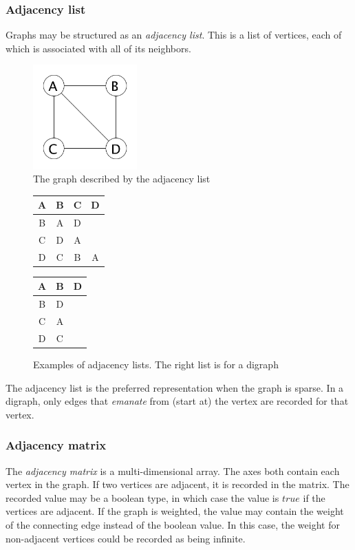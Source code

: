\documentclass{article}
\begin{document}
\subsubsection{Adjacency list}
Graphs may be structured as an {\em adjacency list}. This is a list of vertices, each of which is associated with
all of its neighbors.

\begin{figure}[H]
  \centering
  \includegraphics[width=4cm]{adjacency_list_graph}
  \caption{The graph described by the adjacency list}
\end{figure}

\begin{figure}[H]
  \centering
  \begin{tabular}{|c|c c c|}
    \hline
    A  & B & C & D  \\ [0.5ex]
    \hline
    B  & A & D & \  \\
    \hline
    C  & D & A & \  \\
    \hline
    D  & C & B & A  \\
    \hline
  \end{tabular}
  \quad
  \begin{tabular}{|c|c c|}
    \hline
    A  & B & D  \\ [0.5ex]
    \hline
    B  & D & \  \\
    \hline
    C  & A & \  \\
    \hline
    D  & C & \  \\
    \hline
  \end{tabular}
  \caption{Examples of adjacency lists. The right list is for a digraph}
\end{figure}

The adjacency list is the preferred representation when the graph is sparse.
In a digraph, only edges that {\em emanate} from (start at) the vertex are recorded for that vertex.

\subsubsection{Adjacency matrix}
The {\em adjacency matrix} is a multi-dimensional array. The axes both contain each vertex in the graph.
If two vertices are adjacent, it is recorded in the matrix. The recorded value may be a boolean type, in which
case the value is \(true\) if the vertices are adjacent. If the graph is weighted, the value may contain the
weight of the connecting edge instead of the boolean value. In this case, the weight for non-adjacent vertices
could be recorded as being infinite.
\end{document}
